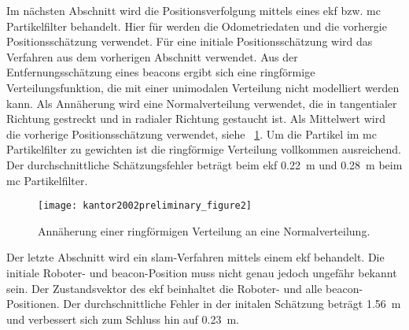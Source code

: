 Im nächsten Abschnitt wird die Positionsverfolgung mittels eines \Gls{ekf} bzw. \Gls{mc} Partikelfilter behandelt. Hier für werden die Odometriedaten und die vorhergie Positionsschätzung verwendet. Für eine initiale Positionsschätzung wird das Verfahren aus dem vorherigen Abschnitt verwendet. Aus der Entfernungsschätzung eines \Glspl{beacon} ergibt sich eine ringförmige Verteilungsfunktion, die mit einer unimodalen Verteilung nicht modelliert werden kann. Als Annäherung wird eine Normalverteilung verwendet, die in tangentialer Richtung gestreckt und in radialer Richtung gestaucht ist. Als Mittelwert wird die vorherige Positionsschätzung verwendet, siehe \figurename~\ref{fig:kantor2002preliminary_figure2}. Um die Partikel im \Gls{mc} Partikelfilter zu gewichten ist die ringförmige Verteilung vollkommen ausreichend. Der durchschnittliche Schätzungsfehler beträgt beim \Gls{ekf} \SI{0.22}{\metre} und \SI{0.28}{\metre} beim \Gls{mc} Partikelfilter.

\begin{figure}[htbp]
	\centering
	\texttt{[image: kantor2002preliminary\_figure2]}
	\caption{Annäherung einer ringförmigen Verteilung an eine Normalverteilung.}
	\label{fig:kantor2002preliminary_figure2}
\end{figure}

Der letzte Abschnitt wird ein \Gls{slam}-Verfahren mittels einem \Gls{ekf} behandelt. Die initiale Roboter- und \Gls{beacon}-Position muss nicht genau jedoch ungefähr bekannt sein. Der Zustandsvektor des \Gls{ekf} beinhaltet die Roboter- und alle \Gls{beacon}-Positionen. Der durchschnittliche Fehler in der initalen Schätzung beträgt \SI{1.56}{\metre} und verbessert sich zum Schluss hin auf \SI{0.23}{\metre}.


\begin{comment}
------------------------------------------------------------------------------------------
- \cite{kurth2003experimental}
	- Experimental results in range-only localization with radio (82)
\end{comment}


\begin{comment}
------------------------------------------------------------------------------------------
- \cite{olson2004robust}
	- Robust range-only beacon localization (264)
	- Wie funktioniert die Exploration Strategy?
		- Die Ungünstigeste strategy ist das geradeausfahren mit einem beacon links und rechts.
		- Das Gradientenfeld der abstanddifferenz zwischen den beiden beacons führt einen auf den optimalen weg um die Abstandsdifferenz zu maximieren. (Aktive Exploration)
\end{comment}

